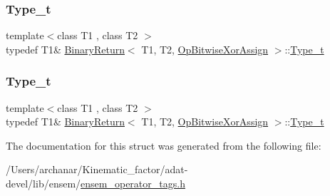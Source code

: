 \mbox{\label{structBinaryReturn_3_01T1_00_01T2_00_01OpBitwiseXorAssign_01_4_a1f3b2b68c0947783fd491c1f8342dfc0}} 
\subsubsection{\texorpdfstring{Type\_t}{Type\_t}\hspace{0.1cm}{\footnotesize\ttfamily [2/3]}}
{\footnotesize\ttfamily template$<$class T1 , class T2 $>$ \\
typedef T1\& \mbox{\hyperlink{structBinaryReturn}{Binary\+Return}}$<$ T1, T2, \mbox{\hyperlink{structOpBitwiseXorAssign}{Op\+Bitwise\+Xor\+Assign}} $>$\+::\mbox{\hyperlink{structBinaryReturn_3_01T1_00_01T2_00_01OpBitwiseXorAssign_01_4_a1f3b2b68c0947783fd491c1f8342dfc0}{Type\+\_\+t}}}

\mbox{\label{structBinaryReturn_3_01T1_00_01T2_00_01OpBitwiseXorAssign_01_4_a1f3b2b68c0947783fd491c1f8342dfc0}} 
\subsubsection{\texorpdfstring{Type\_t}{Type\_t}\hspace{0.1cm}{\footnotesize\ttfamily [3/3]}}
{\footnotesize\ttfamily template$<$class T1 , class T2 $>$ \\
typedef T1\& \mbox{\hyperlink{structBinaryReturn}{Binary\+Return}}$<$ T1, T2, \mbox{\hyperlink{structOpBitwiseXorAssign}{Op\+Bitwise\+Xor\+Assign}} $>$\+::\mbox{\hyperlink{structBinaryReturn_3_01T1_00_01T2_00_01OpBitwiseXorAssign_01_4_a1f3b2b68c0947783fd491c1f8342dfc0}{Type\+\_\+t}}}



The documentation for this struct was generated from the following file\+:\begin{DoxyCompactItemize}
\item 
/\+Users/archanar/\+Kinematic\+\_\+factor/adat-\/devel/lib/ensem/\mbox{\hyperlink{adat-devel_2lib_2ensem_2ensem__operator__tags_8h}{ensem\+\_\+operator\+\_\+tags.\+h}}\end{DoxyCompactItemize}
